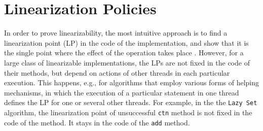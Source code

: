 \section*{Linearization Policies}
\label{controllers:subsection}
In order to prove linearizability, the most intuitive approach is to find a linearization point (LP) in the code of the implementation, and show that it is the single point where the effect of the operation takes place \cite{AHHR:integrated:rep,BLMRS:cav08,Vafeiadis}.
However, for a large class of linearizable implementations,
the LPs are not fixed in the code of their methods, but depend on actions
of other threads in each particular execution. This happens, e.g., for algorithms that
employ various forms of helping mechanisms, in which the execution of a particular
statement in one thread defines the LP for one or several other threads.
For example, in the the {\tt Lazy Set} algorithm, the linearization point of unsuccessful {\tt ctn} method is not fixed in the code of the method.
It stays in the code of the {\tt add} method.

